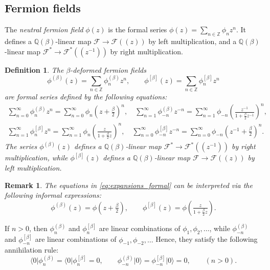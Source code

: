 \documentclass{amsart}
\newtheorem{defi}[thm]{Definition}
\newtheorem{rem}[thm]{Remark}
\def\QQ{\mathord{\mathbb{Q}}}
\def\ZZ{\mathord{\mathbb{Z}}}
\def\ket#1{\vert #1 \rangle}
\def\bra#1{\langle #1 \vert}
\begin{document}
\subsection{Fermion fields}\label{sec:beta_ferm}

The \textit{neutral fermion field} $\phi(z)$ is the formal series $\phi(z) = \sum_{n \in \ZZ} \phi_n z^n$.  
It defines a $\QQ(\beta)$-linear map $\mathcal{F} \to \mathcal{F}((z))$ by left multiplication, and a $\QQ(\beta)$-linear map $\mathcal{F}^\ast \to \mathcal{F}^\ast((z^{-1}))$ by right multiplication.

\begin{defi}\label{defi:deformed_fermions}
The \textit{$\beta$-deformed fermion fields} 
\[
\phi^{(\beta)}(z)=\sum_{n\in \ZZ}\phi^{(\beta)}_nz^n,\qquad \phi^{[\beta]}(z)=\sum_{n\in \ZZ}\phi^{[\beta]}_nz^n
\]
are formal series defined by the following equations:
\begin{equation}\label{eq:expansions_formal}
\begin{gathered}
\sum_{n=0}^\infty \phi^{(\beta)}_nz^n=
\sum_{n=0}^\infty \phi_n\left(z+\tfrac{\beta}{2}\right)^n,\quad
\sum_{n=1}^\infty \phi^{(\beta)}_{-n}z^{-n}=
\sum_{n=1}^\infty \phi_{-n}\left(\frac{z^{-1}}{1+\frac{\beta}{2}z^{-1}}\right)^n,\\
\sum_{n=1}^\infty \phi^{[\beta]}_nz^n=
\sum_{n=1}^\infty \phi_n\left(\frac{z}{1+\frac{\beta}{2}z}\right)^n,\quad
\sum_{n=0}^\infty \phi^{[\beta]}_{-n}z^{-n}=
\sum_{n=0}^\infty \phi_{-n}\left(z^{-1}+\tfrac{\beta}{2}\right)^n.
\end{gathered}
\end{equation}
The series $\phi^{(\beta)}(z)$ defines a $\QQ(\beta)$-linear map $\mathcal{F}^\ast \to \mathcal{F}^\ast((z^{-1}))$ by right multiplication,  
while $\phi^{[\beta]}(z)$ defines a $\QQ(\beta)$-linear map $\mathcal{F} \to \mathcal{F}((z))$ by left multiplication.
\end{defi}

\begin{rem}
The equations in \eqref{eq:expansions_formal} can be interpreted via the following informal expressions:
\begin{equation}\label{eq:def_of_b_deformed_fermion}
\phi^{(\beta)}(z)=\phi\left(z+\tfrac{\beta}{2}\right),\qquad
\phi^{[\beta]}(z)=\phi\left(\tfrac{z}{1+\frac{\beta}{2}z}\right).
\end{equation}
\end{rem}


If $n>0$, then $\phi^{(\beta)}_n$ and $\phi^{[\beta]}_n$ are linear combinations of $\phi_1,\phi_2,\dots$, while $\phi^{(\beta)}_{-n}$ and $\phi^{[\beta]}_{-n}$ are linear combinations of $\phi_{-1},\phi_{-2},\dots$
Hence, they satisfy the following annihilation rule:
\begin{equation}\label{eq:ann_rule}
\bra{0}\phi_n^{(\beta)}=\bra{0}\phi_n^{[\beta]}=0,\qquad
\phi_{-n}^{(\beta)}\ket{0}=\phi_{-n}^{[\beta]}\ket{0}=0,\qquad (n>0).
\end{equation}
\end{document}
